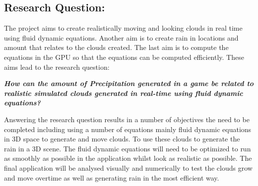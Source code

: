 \subsection{Research Question:}
The project aims to create realistically moving and looking clouds in real time using fluid dynamic equations.
Another aim is to create rain in locations and amount that relates to the clouds created.
The last aim is to compute the equations in the GPU so that the equations can be computed efficiently.
These aims lead to the research question:

\textit{\textbf{How can the amount of Precipitation generated in a game be related to realistic simulated clouds generated in real-time using fluid dynamic equations?}}

Answering the research question results in a number of objectives the need to be completed including using a number of equations mainly fluid dynamic equations in 3D space to generate and move clouds.
To use these clouds to generate the rain in a 3D scene. 
The fluid dynamic equations will need to be optimized to run as smoothly as possible in the application whilst look as realistic as possible.
The final application will be analysed visually and numerically to test the clouds grow and move overtime as well as generating rain in the most efficient way.